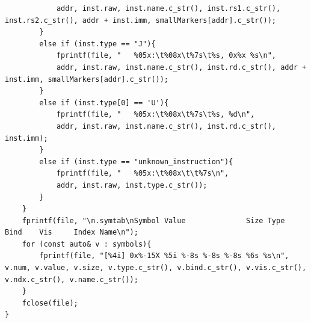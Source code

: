 \documentclass{article}
\begin{document}
\begin{lstlisting}
			addr, inst.raw, inst.name.c_str(), inst.rs1.c_str(), inst.rs2.c_str(), addr + inst.imm, smallMarkers[addr].c_str());
		}
		else if (inst.type == "J"){
			fprintf(file, "   %05x:\t%08x\t%7s\t%s, 0x%x %s\n",
			addr, inst.raw, inst.name.c_str(), inst.rd.c_str(), addr + inst.imm, smallMarkers[addr].c_str());
		}
		else if (inst.type[0] == 'U'){
			fprintf(file, "   %05x:\t%08x\t%7s\t%s, %d\n",
			addr, inst.raw, inst.name.c_str(), inst.rd.c_str(), inst.imm);
		}
		else if (inst.type == "unknown_instruction"){
			fprintf(file, "   %05x:\t%08x\t\t%7s\n",
			addr, inst.raw, inst.type.c_str());
		}
	}
	fprintf(file, "\n.symtab\nSymbol Value          	Size Type 	Bind 	Vis   	Index Name\n");
	for (const auto& v : symbols){
		fprintf(file, "[%4i] 0x%-15X %5i %-8s %-8s %-8s %6s %s\n", v.num, v.value, v.size, v.type.c_str(), v.bind.c_str(), v.vis.c_str(), v.ndx.c_str(), v.name.c_str());
	}
	fclose(file);
}

\end{lstlisting}
\end{document}
